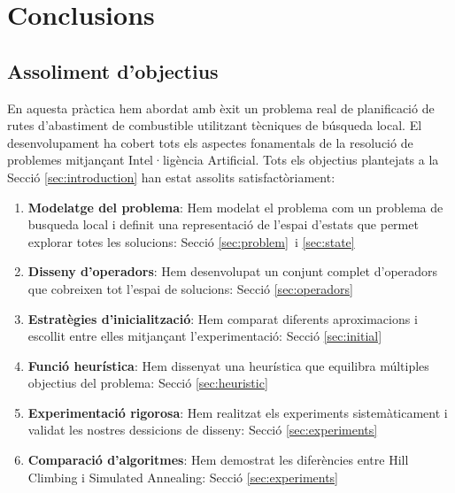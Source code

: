 \section{Conclusions}
\label{sec:conclusions}

\vspace{0.5cm}


\subsection{Assoliment d'objectius}

En aquesta pràctica hem abordat amb èxit un problema real de planificació de rutes d'abastiment de combustible utilitzant tècniques de búsqueda local. El desenvolupament ha cobert tots els aspectes fonamentals de la resolució de problemes mitjançant Intel·ligència Artificial. Tots els objectius plantejats a la Secció \ref{sec:introduction} han estat assolits satisfactòriament:

\begin{enumerate}
    \item \textbf{Modelatge del problema}: Hem modelat el problema com un problema de busqueda local i definit una representació de l'espai d'estats que permet explorar totes les solucions: Secció \ref{sec:problem}\ i \ref{sec:state} \
    
    \item \textbf{Disseny d'operadors}: Hem desenvolupat un conjunt complet d'operadors que cobreixen tot l'espai de solucions: Secció  \ref{sec:operadors} \
    
    \item \textbf{Estratègies d'inicialització}: Hem comparat diferents aproximacions i escollit entre elles mitjançant l'experimentació: Secció \ref{sec:initial} \
    
    \item \textbf{Funció heurística}: Hem dissenyat una heurística que equilibra múltiples objectius del problema: Secció \ref{sec:heuristic} \
    
    \item \textbf{Experimentació rigorosa}: Hem realitzat els experiments sistemàticament i validat les nostres dessicions de disseny: Secció  \ref{sec:experiments} \
    
    \item \textbf{Comparació d'algoritmes}: Hem demostrat les diferències entre Hill Climbing i Simulated Annealing: Secció \ref{sec:experiments} \
    
\end{enumerate}

